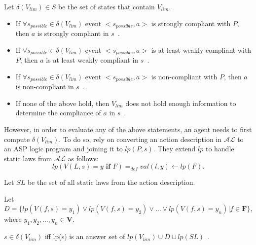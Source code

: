 \begin{definition}
    Let $\delta(V_{lim}) \in S$ be the set of states that contain $V_{lim}$.

    \begin{itemize}
        \item If $\forall s_{possible} \in \delta(V_{lim})$ event $<s_{possible}, a>$ is strongly compliant with $P$, then $a$ is strongly compliant in $s$~\citep{gelfond_authorization_2008}.
        \item If $\forall s_{possible} \in \delta(V_{lim})$ event $<s_{possible}, a>$ is at least weakly compliant with $P$, then $a$ is at least weakly compliant in $s$~\citep{gelfond_authorization_2008}.
        \item If $\forall s_{possible} \in \delta(V_{lim})$ event $<s_{possible}, a>$ is non-compliant with $P$, then $a$ is non-compliant in $s$~\citep{gelfond_authorization_2008}.
        \item If none of the above hold, then $V_{lim}$ does not hold enough information to determine the compliance of $a$ in $s$~\citep{gelfond_authorization_2008}.
    \end{itemize}
\end{definition}

However, in order to evaluate any of the above statements, an agent needs to first compute $\delta(V_{lim})$.
To do so, \citet{gelfond_authorization_2008} rely on converting an action description in $\mathcal{AL}$ to an ASP logic program and joining it to $lp(P, s)$.
They extend $lp$ to handle static laws from $\mathcal{AL}$ as follows:
\begin{equation}
    lp(V(L,s)=y \textbf{ if } F) =_{def} val(l, y) \leftarrow lp(F).
\end{equation}

Let $SL$ be the set of all static laws from the action description.

Let $D = \{lp(V(f,s)=y_1) \lor lp(V(f,s)=y_2) \lor \dots \lor lp(V(f,s)=y_n) | f \in \boldsymbol{F}\}$, where $y_1, y_2, \dots, y_n \in \boldsymbol{V}$.

\begin{definition}
    $s \in \delta(V_{lim})$ iff lp(s) is an answer set of $lp(V_{lim}) \cup D \cup lp(SL)$~\citep{gelfond_authorization_2008}.
\end{definition}


